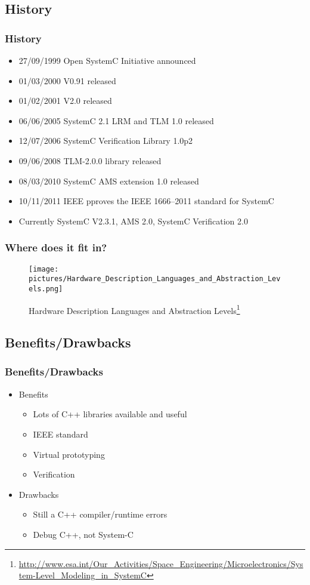 \documentclass{beamer}
\begin{document}
\subsection{History}
\begin{frame}\frametitle{History} 
\begin{itemize}
	\item 27/09/1999 Open SystemC Initiative announced
	\item 01/03/2000 V0.91 released
	\item 01/02/2001 V2.0 released
	\item 06/06/2005 SystemC 2.1 LRM and TLM 1.0 released
	\item 12/07/2006 SystemC Verification Library 1.0p2
	\item 09/06/2008 TLM-2.0.0 library released
	\item 08/03/2010 SystemC AMS extension 1.0 released
	\item 10/11/2011 IEEE pproves the IEEE 1666–2011 standard for SystemC
	\item Currently SystemC V2.3.1, AMS 2.0, SystemC Verification 2.0
\end{itemize}
\end{frame}


\begin{frame}\frametitle{Where does it fit in?} 
	    \begin{figure}[hp]
	      \centering
	      \texttt{[image: pictures/Hardware\_Description\_Languages\_and\_Abstraction\_Levels.png]}
	      \caption{Hardware Description Languages and Abstraction Levels\footnote[frame]{\url{http://www.esa.int/Our_Activities/Space_Engineering/Microelectronics/System-Level_Modeling_in_SystemC}}}
	      \label{fig:flow}
	    \end{figure} 

\end{frame}

\subsection{Benefits/Drawbacks}
\begin{frame}\frametitle{Benefits/Drawbacks} 
\begin{itemize}
	\item Benefits
	\begin{itemize}
		\item Lots of C++ libraries available and useful
		\item IEEE standard
		\item Virtual prototyping
		\item Verification
	\end{itemize}
	\item Drawbacks \begin{itemize}
		\item Still a C++ compiler/runtime errors
		\item Debug C++, not System-C
	\end{itemize}
\end{itemize}
\end{frame}
\end{document}
